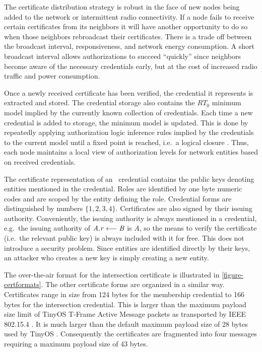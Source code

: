 The certificate distribution strategy is robust in the face of new nodes being added to the
network or intermittent radio connectivity. If a node fails to receive certain certificates from
its neighbors it will have another opportunity to do so when those neighbors rebroadcast their
certificates. There is a trade off between the broadcast interval, responsiveness, and network
energy consumption. A short broadcast interval allows authorizations to succeed ``quickly''
since neighbors become aware of the necessary credentials early, but at the cost of increased
radio traffic and power consumption.

Once a newly received certificate has been verified, the credential it represents is extracted
and stored. The credential storage also contains the $RT_0$ minimum model implied by the
currently known collection of credentials. Each time a new credential is added to storage, the
minimum model is updated. This is done by repeatedly applying authorization logic inference
rules implied by the credentials to the current model until a fixed point is reached, i.e.~a
logical closure \cite{Li:DCFTML}. Thus, each node maintains a local view of authorization levels
for network entities based on received credentials.

The certificate representation of an \RT\ credential contains the public keys denoting entities
mentioned in the credential. Roles are identified by one byte numeric codes and are scoped by
the entity defining the role. Credential forms are distinguished by numbers $\{ 1, 2, 3, 4 \}$.
Certificates are also signed by their issuing authority. Conveniently, the issuing authority is
always mentioned in a credential, e.g.~the issuing authority of $\mathit{A.r} \stackrel{}{\longleftarrow} \mathit{B}$ is $A$, so the
means to verify the certificate (i.e.~the relevant public key) is always included with it for
free. This does not introduce a security problem. Since entities are identified directly by
their keys, an attacker who creates a new key is simply creating a new entity.

The over-the-air format for the intersection certificate is illustrated in
\autoref{figure-certformats}. The other certificate forms are organized in a similar way.
Certificates range in size from 124 bytes for the membership credential to 166 bytes for the
intersection credential. This is larger than the maximum payload size limit of TinyOS T-Frame
Active Message packets as transported by IEEE 802.15.4 \cite{802.15.4,hui-tep125}. It is much
larger than the default maximum payload size of 28 bytes used by TinyOS \cite{levis-tep111}.
Consequently the certificates are fragmented into four messages requiring a maximum payload size
of 43 bytes.

